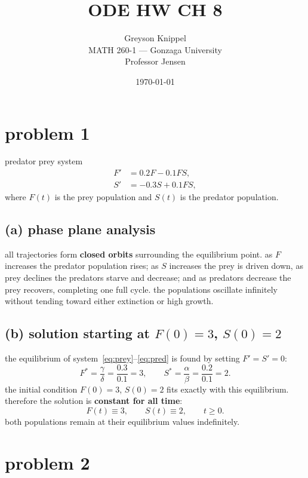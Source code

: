\documentclass[12pt]{article}
\title{ODE HW CH 8}
\author{
Greyson Knippel \\[4pt]
MATH 260-1 --- Gonzaga University \\[4pt]
Professor Jensen
}
\date{\today}
\begin{document}
\maketitle


\section*{problem 1}

predator prey system
\begin{align}
    F' &= 0.2F - 0.1FS, \label{eq:prey}\\
    S' &= -0.3S + 0.1FS, \label{eq:pred}
\end{align}
where $F(t)$ is the prey population and $S(t)$ is the predator population.

\subsection*{(a) phase plane analysis}

all trajectories form \textbf{closed orbits} surrounding the
equilibrium point. as $F$ increases the predator population
rises; as $S$ increases the prey is driven down, as prey
declines the predators starve and decrease; and as predators decrease the
prey recovers, completing one full cycle. the populations oscillate infinitely without tending toward
either extinction or high growth.

\subsection*{(b) solution starting at $F(0)=3$, $S(0)=2$}

the equilibrium of system~\eqref{eq:prey}--\eqref{eq:pred} is
found by setting $F'=S'=0$:
\[
    F^* = \frac{\gamma}{\delta} = \frac{0.3}{0.1} = 3,
    \qquad
    S^* = \frac{\alpha}{\beta} = \frac{0.2}{0.1} = 2.
\]
the initial condition $F(0)=3$, $S(0)=2$ fits exactly with this
equilibrium.  therefore the solution is \textbf{constant for all time}:
\[
    F(t) \equiv 3, \qquad S(t) \equiv 2, \qquad t \geq 0.
\]
both populations remain at their equilibrium values indefinitely.

\section*{problem 2}
 
\end{document}
